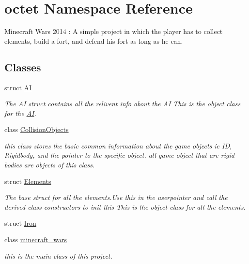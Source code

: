 \hypertarget{namespaceoctet}{\section{octet Namespace Reference}
\label{namespaceoctet}
}


Minecraft Wars 2014 \+: A simple project in which the player has to collect elements, build a fort, and defend his fort as long as he can.  


\subsection*{Classes}
\begin{DoxyCompactItemize}
\item 
struct \hyperlink{structoctet_1_1_a_i}{A\+I}
\begin{DoxyCompactList}\small\item\em The \hyperlink{structoctet_1_1_a_i}{A\+I} struct contains all the relivent info about the \hyperlink{structoctet_1_1_a_i}{A\+I} This is the object class for the \hyperlink{structoctet_1_1_a_i}{A\+I}. \end{DoxyCompactList}\item 
class \hyperlink{classoctet_1_1_collision_objects}{Collision\+Objects}
\begin{DoxyCompactList}\small\item\em this class stores the basic common information about the game objects ie I\+D, Rigidbody, and the pointer to the specific object. all game object that are rigid bodies are objects of this class. \end{DoxyCompactList}\item 
struct \hyperlink{structoctet_1_1_elements}{Elements}
\begin{DoxyCompactList}\small\item\em The base struct for all the elements.\+Use this in the userpointer and call the derived class constructors to init this This is the object class for all the elements. \end{DoxyCompactList}\item 
struct \hyperlink{structoctet_1_1_iron}{Iron}
\item 
class \hyperlink{classoctet_1_1minecraft__wars}{minecraft\+\_\+wars}
\begin{DoxyCompactList}\small\item\em this is the main class of this project. \end{DoxyCompactList}\item 

\end{DoxyCompactItemize}
